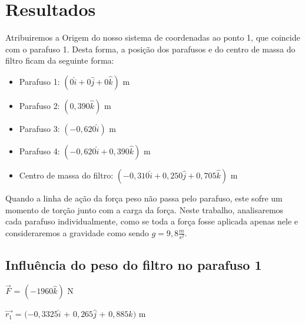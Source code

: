 \documentclass[
	12pt,				%
	oneside,			%
	a4paper,			%
	english,			%
	french,				%
	spanish,			%
	brazil,				%
	]{abntex2}
\begin{document}

\newpage
\section[Resultados]{Resultados}
\pagestyle{fancy}

Atribuiremos a Origem do nosso sistema de coordenadas ao ponto 1, que coincide com o parafuso 1. Desta forma, a posição dos parafusos e do centro de massa do filtro ficam da seguinte forma:

\begin{itemize}

\item Parafuso 1: $(0\widehat{i}+ 0\widehat{j} + 0 \widehat{k})$ m
\item Parafuso 2: $(0,390\widehat{k})$ m
\item Parafuso 3: $(-0,620\widehat{i})$ m
\item Parafuso 4: $(-0,620\widehat{i} + 0,390\widehat{k})$ m
\item Centro de massa do filtro: $(-0,310\widehat{i} + 0,250\widehat{j} + 0,705\widehat{k})$ m

\end{itemize}

Quando a linha de ação da força peso não passa pelo parafuso, este sofre um momento de torção junto com a carga da força. Neste trabalho, analisaremos cada parafuso individualmente, como se toda a força fosse aplicada apenas nele e consideraremos a gravidade como sendo $g=9,8\frac{m}{s^{2}}$. \cite{hibbeler2005estatica}

\subsection{Influência do peso do filtro no parafuso 1}

$\vec{F}$ = $(-1960\widehat{k})$ N

$\vec{r_{1}}$ = $(-0,3325\widehat{i}$ + $0,265\widehat{j}$ + $0,885\widehat{k})$ m
\end{document}
